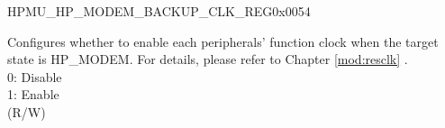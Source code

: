 \begin{register}{H}{PMU\_HP\_MODEM\_BACKUP\_CLK\_REG}{0x0054}\label{regdesc:PMUHPMODEMBACKUPCLKREG}
%
\regnewline%
\begin{regdesc}\begin{reglist}
\label{fielddesc:PMUHPMODEMBACKUPICGFUNCEN}\item [PMU\_HP\_MODEM\_BACKUP\_ICG\_FUNC\_EN] Configures whether to enable each peripherals' function clock when the target state is HP\_MODEM. For details, please refer to Chapter \ref{mod:resclk} \textit{}.\\
0: Disable\\
1: Enable\\
(R/W)
\end{reglist}\end{regdesc}
\end{register}


